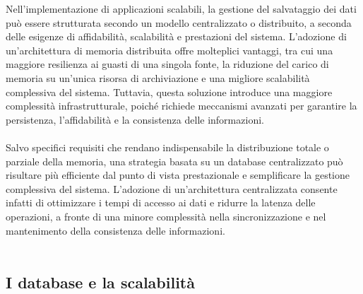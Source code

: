 Nell’implementazione di applicazioni scalabili, la gestione del salvataggio dei dati può essere strutturata secondo un modello centralizzato o distribuito, 
a seconda delle esigenze di affidabilità, scalabilità e prestazioni del sistema. 
L’adozione di un’architettura di memoria distribuita offre molteplici vantaggi, tra cui una maggiore resilienza ai guasti di una singola fonte, 
la riduzione del carico di memoria su un'unica risorsa di archiviazione e una migliore scalabilità complessiva del sistema. 
Tuttavia, questa soluzione introduce una maggiore complessità infrastrutturale, poiché richiede meccanismi avanzati per garantire la persistenza, 
l’affidabilità e la consistenza delle informazioni.\\
\\
Salvo specifici requisiti che rendano indispensabile la distribuzione totale o parziale della memoria, 
una strategia basata su un database centralizzato può risultare più efficiente dal punto di vista prestazionale e semplificare la gestione complessiva del sistema. 
L’adozione di un’architettura centralizzata consente infatti di ottimizzare i tempi di accesso ai dati e ridurre la latenza delle operazioni, 
a fronte di una minore complessità nella sincronizzazione e nel mantenimento della consistenza delle informazioni.\\
\\
\subsection{I database e la scalabilità}

